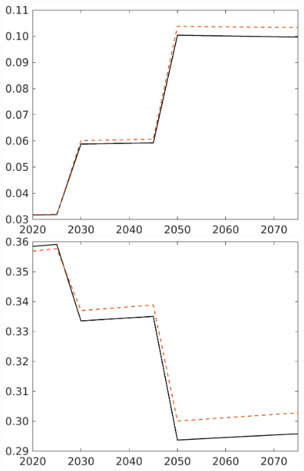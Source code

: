 \begin{figure}[h!!]
\begin{minipage}[]{0.32\textwidth}
	\end{minipage}
	\begin{minipage}[]{0.32\textwidth}
		\includegraphics[width=1\textwidth]{../../codding_model/own_basedOnFried/optimalPol_elastS_DisuSci/figures/all_1705/comp_notaul_OPT_T_NoTaus_sg_spillover0_sep1_BN0_ineq0_red0_etaa0.79_lgd0.png}
	\end{minipage}
	\begin{minipage}[]{0.32\textwidth}
		\includegraphics[width=1\textwidth]{../../codding_model/own_basedOnFried/optimalPol_elastS_DisuSci/figures/all_1705/comp_notaul_OPT_T_NoTaus_sn_spillover0_sep1_BN0_ineq0_red0_etaa0.79_lgd0.png}
	\end{minipage}
	

\end{figure}
